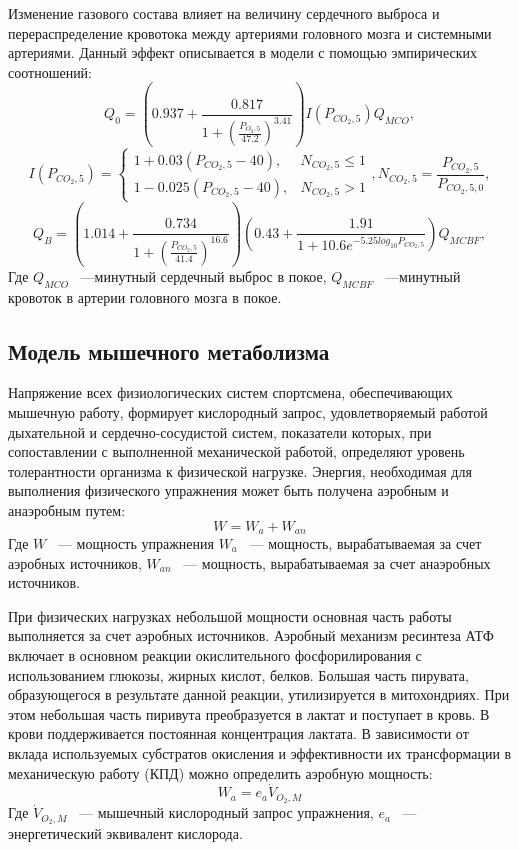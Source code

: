 Изменение газового состава влияет на величину сердечного выброса и перераспределение кровотока между артериями головного мозга и системными артериями. Данный эффект описывается в модели с помощью эмпирических соотношений:
\begin{equation}\label{heartFlow}
Q_{0}=\left(0.937+\frac{0.817}{1+\left(\frac{P_{O_{2},5}}{47.2} \right)^{3.41}} \right)I(P_{CO_{2},5})Q_{MCO},
\end{equation}
\begin{equation}\label{brainFlow}
I(P_{CO_{2},5})=\begin{cases}
1+0.03(P_{CO_{2},5}-40), & N_{CO_{2},5}\le 1 \\
1-0.025(P_{CO_{2},5}-40), & N_{CO_{2},5}> 1 
\end{cases}, 
N_{CO_{2},5}=\frac{P_{CO_{2},5}}{P_{CO_{2},5,0}},
\end{equation}
\begin{equation}
Q_{B}=\left(1.014+\frac{0.734}{1+\left(\frac{P_{CO_{2},5}}{41.4}\right)^{16.6}} \right)\left(0.43+\frac{1.91}{1+10.6e^{-5.25log_{10}P_{CO_{2},5}}} \right)Q_{MCBF},
\end{equation}
Где $Q_{MCO}$  ~---минутный сердечный выброс в покое, $Q_{MCBF}$  ~---минутный кровоток в артерии головного мозга в покое. 

\subsection{Модель мышечного метаболизма}

Напряжение всех физиологических систем спортсмена, обеспечивающих мышечную работу, формирует кислородный запрос, удовлетворяемый работой дыхательной и сердечно-сосудистой систем, показатели которых, при сопоставлении с выполненной механической работой, определяют уровень толерантности организма к физической нагрузке.
Энергия, необходимая для выполнения физического упражнения может быть получена аэробным и анаэробным путем: 
\begin{equation}\label{eq:W}
W=W_{a}+W_{an}
\end{equation}
Где \( W \) ~--- мощность упражнения \( W_{a} \) ~--- мощность, вырабатываемая за счет аэробных источников,  \( W_{an} \) ~--- мощность, вырабатываемая за счет анаэробных источников.

При физических нагрузках небольшой мощности основная часть работы выполняется за счет аэробных источников. Аэробный механизм ресинтеза АТФ включает в основном реакции окислительного фосфорилирования с использованием глюкозы, жирных кислот, белков. Большая часть пирувата, образующегося в результате данной реакции, утилизируется в митохондриях. При этом небольшая часть пиривута преобразуется в лактат и поступает в кровь. В крови поддерживается постоянная концентрация лактата. В зависимости от вклада используемых субстратов окисления и эффективности их трансформации в механическую работу (КПД) можно определить аэробную мощность:
\begin{equation}\label{eq:Wa}
W_{a}=e_{a}\dot{V}_{O_{2},M}
\end{equation}
Где \( \dot{V}_{O_{2},M} \) ~--- мышечный кислородный запрос упражнения, \(e_{a}\) ~--- энергетический эквивалент кислорода.

